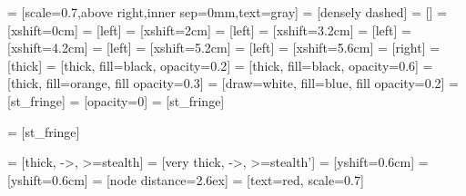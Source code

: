  = [scale=0.7,above right,inner sep=0mm,text=gray] 
 = [densely dashed]
 = []
 = [xshift=0cm]
 = [left]
 = [xshift=2cm]
 = [left]
 = [xshift=3.2cm]
 = [left]
 = [xshift=4.2cm]
 = [left]
 = [xshift=5.2cm]
 = [left]
 = [xshift=5.6cm]
 = [right]
 = [thick]
 = [thick, fill=black, opacity=0.2]
 = [thick, fill=black, opacity=0.6]
 = [thick, fill=orange, fill opacity=0.3]
 = [draw=white, fill=blue, fill opacity=0.2]
 = 	%
								[st_fringe]
 = 	[opacity=0]
 = 	%
								[st_fringe]

 = 	%
								[st_fringe]




 = [thick, ->, >=stealth]
 = [very thick, ->, >=stealth']
 = [yshift=0.6cm]
 = [yshift=0.6cm]
 = [node distance=2.6ex]
 = [text=red, scale=0.7]

